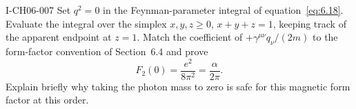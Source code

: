 \begin{exercise}{I-CH06-007}
Set \(q^2=0\) in the Feynman-parameter integral of
equation~\eqref{eq:6.18}.  Evaluate the integral over the simplex
\(x,y,z\geq0\), \(x+y+z=1\), keeping track of the apparent endpoint at
\(z=1\).  Match the coefficient of
\(+\gamma^{\mu\nu}q_\nu/(2m)\) to the form-factor convention of
Section~6.4 and prove
\[
 F_2(0)=\frac{e^2}{8\pi^2}=\frac{\alpha}{2\pi}.
\]
Explain briefly why taking the photon mass to zero is safe for this magnetic
form factor at this order.
\end{exercise}
